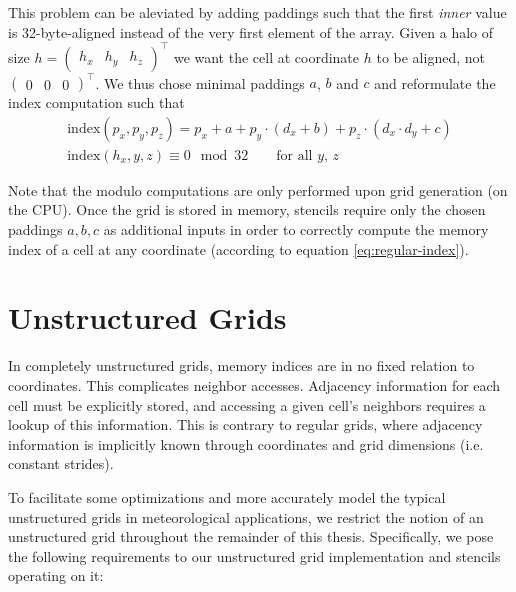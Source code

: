 This problem can be aleviated by adding paddings such that the first \emph{inner} value is 32-byte-aligned instead of the very first element of the array. Given a halo of size $h = \begin{pmatrix}h_x & h_y & h_z\end{pmatrix}^\top$ we want the cell at coordinate $h$ to be aligned, not $\begin{pmatrix} 0 & 0 & 0\end{pmatrix}^\top$. We thus chose minimal paddings $a$, $b$ and $c$ and reformulate the index computation such that
\begin{gather}
    \text{index}\left(p_x, p_y, p_z\right) = p_x + a + p_y \cdot \left(d_x + b\right) + p_z \cdot \left(d_x \cdot d_y + c\right) \label{eq:regular-index}
    \\
    \text{index}\left(h_x, y, z\right) \equiv 0 \mod 32 \qquad \text{for all $y$, $z$}
\end{gather}

Note that the modulo computations are only performed upon grid generation (on the CPU). Once the grid is stored in memory, stencils require only the chosen paddings $a, b, c$ as additional inputs in order to correctly compute the memory index of a cell at any coordinate (according to equation \ref{eq:regular-index}).

\section{Unstructured Grids}

In completely unstructured grids, 
memory indices are in no fixed relation to coordinates. This complicates neighbor accesses. Adjacency information for each cell must be explicitly stored, and accessing a given cell's neighbors requires a lookup of this information. This is contrary to regular grids, where adjacency information is implicitly known through coordinates and grid dimensions (i.e. constant strides).

To facilitate some optimizations and more accurately model the typical unstructured grids in meteorological applications, we restrict the notion of an unstructured grid throughout the remainder of this thesis. Specifically, we pose the following requirements to our unstructured grid implementation and stencils operating on it:

